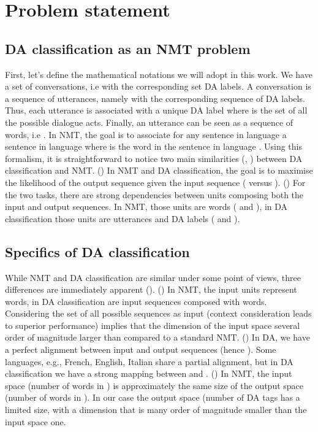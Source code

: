 \documentclass[letterpaper]{article} \usepackage{aaai20}  \usepackage{times}  \usepackage{helvet} \usepackage{courier}  \usepackage[hyphens]{url}  \usepackage{graphicx} \urlstyle{rm} \def\UrlFont{\rm}  \usepackage{graphicx}  \frenchspacing  \setlength{\pdfpagewidth}{8.5in}  \setlength{\pdfpageheight}{11in}
\begin{document}
\section{Problem statement}
\subsection{DA classification as an NMT problem}
First, let's define the mathematical notations we will adopt in this work. We have a set  of conversations, i.e  with  the corresponding set DA labels. A conversation  is a sequence of utterances, namely  with  the corresponding sequence of DA labels. Thus, each utterance  is associated with a unique DA label  where  is the set of all the possible dialogue acts. Finally, an utterance  can be seen as a sequence of words, i.e . In NMT, the goal is to associate for any sentence  in language  a sentence  in language  where  is the  word in the sentence in language .
Using this formalism, it is straightforward to notice two main similarities (, ) between DA classification and NMT. () In NMT and DA classification, the goal is to maximise the likelihood of the output sequence given the input sequence ( versus ). () For the two tasks, there are strong dependencies between units composing both the input and output sequences. In NMT, those units are words ( and ), in DA classification those units are utterances and DA labels ( and ).

\subsection{Specifics of DA classification}\label{ssec:differences}
While NMT and DA classification are similar under some point of views, three differences are immediately apparent ().
() In NMT, the input units  represent words, in DA classification  are input sequences composed with words. Considering the set of all possible sequences as input (context consideration leads to superior performance) implies that the dimension of the input space several order of magnitude larger than compared to a standard NMT. () In DA, we have a perfect alignment between input and output sequences (hence ). Some languages, e.g., French, English, Italian share a partial alignment, but in DA classification we have a strong mapping between  and . () In NMT, the input space (number of words in ) is approximately the same size of the output space (number of words in ). In our case the output space (number of DA tags  has a limited size, with a dimension that is many order of magnitude smaller than the input space one.
\end{document}
